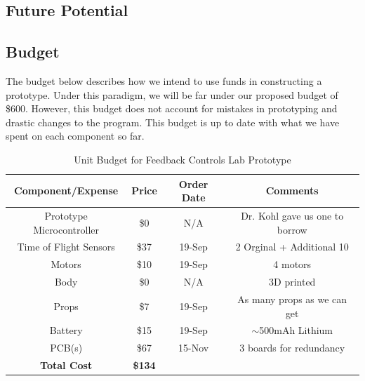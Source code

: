 \documentclass[12pt, titlepage]{article}
\begin{document}
\subsection{Future Potential}

\subsection{Budget}
The budget below describes how we intend to use funds in constructing a prototype. Under this paradigm, we will be far under our proposed budget of \$600. However, this budget does not account for mistakes in prototyping and drastic changes to the program. This budget is up to date with what we have spent on each component so far.

\begin{table}[H]
\centering
\caption{Unit Budget for Feedback Controls Lab Prototype}
\label{tab:budget}
\begin{tabular}{||c|c|c|c||}
\hline 
\hline
\textbf{Component/Expense} & \textbf{Price} & \textbf{Order Date} & \textbf{Comments} \\ 
\hline 
Prototype Microcontroller & \$0 & N/A & Dr. Kohl gave us one to borrow \\
\hline 
Time of Flight Sensors & \$37 & 19-Sep & 2 Orginal + Additional 10 \\
\hline 
Motors & \$10 & 19-Sep & 4 motors \\ 
\hline 
Body & \$0 & N/A & 3D printed \\ 
\hline 
Props & \$7 & 19-Sep & As many props as we can get \\ 
\hline 
Battery & \$15 & 19-Sep & $\sim$500mAh Lithium \\ 
\hline 
PCB(s) & \$67 & 15-Nov & 3 boards for redundancy \\ 
\hline 
\textbf{Total Cost} & \textbf{\$134} &  &  \\ 
\hline 
\hline
\end{tabular} 
\end{table}
\end{document}
